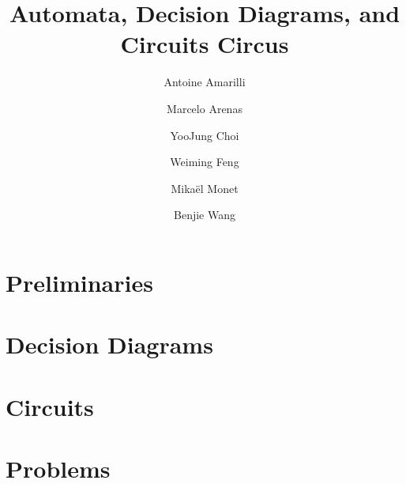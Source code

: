 \documentclass[letterpaper,11pt]{article}
\begin{document}
\title{Automata, Decision Diagrams, and Circuits Circus}

\author{Antoine Amarilli \and Marcelo Arenas \and YooJung Choi \and Weiming Feng \and Mikaël Monet \and Benjie Wang}

\date{}
\maketitle

\section{Preliminaries}


\section{Decision Diagrams}


\section{Circuits}


\section{Problems}




\end{document}
